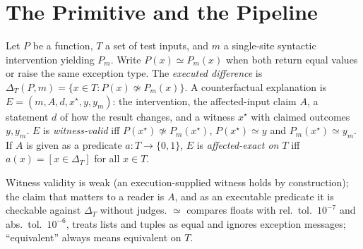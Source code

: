 \section{The Primitive and the \CoDE Pipeline}\label{sec:approach}
\begin{definition}\label{def:cfe}
Let $P$ be a function, $T$ a set of test inputs, and $m$ a single-site syntactic intervention yielding $P_m$. Write
$P(x)\simeq P_m(x)$ when both return equal values or raise the same exception type. The \emph{executed difference} is
$\Delta_T(P,m)=\{x\in T : P(x)\not\simeq P_m(x)\}$. A counterfactual explanation is $E=(m,A,d,x^\star,y,y_m)$: the
intervention, the affected-input claim $A$, a statement $d$ of how the result changes, and a witness $x^\star$ with claimed
outcomes $y,y_m$. $E$ is \emph{witness-valid} iff $P(x^\star)\not\simeq P_m(x^\star)$, $P(x^\star)\simeq y$ and
$P_m(x^\star)\simeq y_m$. If $A$ is given as a predicate $a:T\to\{0,1\}$, $E$ is \emph{affected-exact on $T$} iff
$a(x)=[x\in\Delta_T]$ for all $x\in T$.
\end{definition}
Witness validity is weak (an execution-supplied witness holds by construction); the claim that matters to a reader is
$A$, and as an executable predicate it is checkable against $\Delta_T$ without judges.
$\simeq$ compares floats with rel.\ tol.\ $10^{-7}$ and abs.\ tol.\ $10^{-6}$, treats lists and tuples as equal and ignores
exception messages; ``equivalent'' always means equivalent on $T$.

